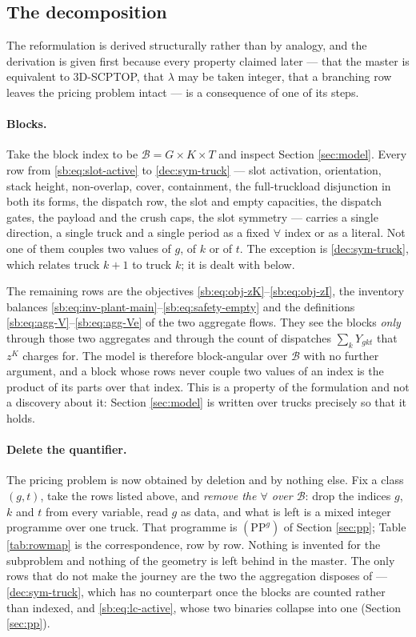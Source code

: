 \subsection{The decomposition}
\label{sec:decomp}

The reformulation is derived structurally rather than by analogy, and
the derivation is given first because every property claimed later ---
that the master is equivalent to 3D-SCPTOP, that $\lambda$ may be taken
integer, that a branching row leaves the pricing problem intact --- is
a consequence of one of its steps.

\paragraph{Blocks.}
Take the block index to be $\mathcal{B}=G\times K\times T$ and inspect
Section \ref{sec:model}. Every row from \eqref{sb:eq:slot-active} to
\eqref{dec:sym-truck} --- slot activation, orientation, stack height,
non-overlap, cover, containment, the full-truckload disjunction in both
its forms, the dispatch row, the slot and empty capacities, the
dispatch gates, the payload and the crush caps, the slot symmetry ---
carries a single direction, a single truck and a single period as a
fixed $\forall$ index or as a literal. Not one of them couples two
values of $g$, of $k$ or of $t$. The exception is
\eqref{dec:sym-truck}, which relates truck $k+1$ to truck $k$; it is
dealt with below.

The remaining rows are the objectives
\eqref{sb:eq:obj-zK}--\eqref{sb:eq:obj-zI}, the inventory balances
\eqref{sb:eq:inv-plant-main}--\eqref{sb:eq:safety-empty} and the
definitions \eqref{sb:eq:agg-V}--\eqref{sb:eq:agg-Ve} of the two
aggregate flows. They see the blocks \emph{only} through those two
aggregates and through the count of dispatches $\sum_{k}Y_{gkt}$ that
$z^{K}$ charges for. The model is therefore block-angular over
$\mathcal{B}$ with no further argument, and a block whose rows never
couple two values of an index is the product of its parts over that
index. This is a property of the formulation and not a discovery about
it: Section \ref{sec:model} is written over trucks precisely so that it
holds.

\paragraph{Delete the quantifier.}
The pricing problem is now obtained by deletion and by nothing else.
Fix a class $(g,t)$, take the rows listed above, and \emph{remove the
$\forall$ over $\mathcal{B}$}: drop the indices $g$, $k$ and $t$ from
every variable, read $g$ as data, and what is left is a mixed integer
programme over one truck. That programme is $(\mathrm{PP}^{g})$ of
Section \ref{sec:pp}; Table \ref{tab:rowmap} is the correspondence, row
by row. Nothing is invented for the subproblem and nothing of the
geometry is left behind in the master. The only rows that do not make
the journey are the two the aggregation disposes of ---
\eqref{dec:sym-truck}, which has no counterpart once the blocks are
counted rather than indexed, and \eqref{sb:eq:lc-active}, whose two
binaries collapse into one (Section \ref{sec:pp}).

